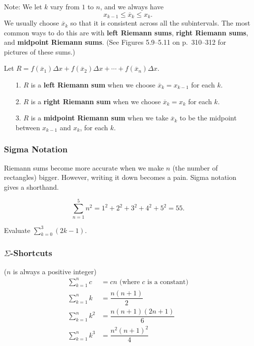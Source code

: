\documentclass[14pt]{beamer}
\newcommand{\dsum}{\displaystyle\sum}
\begin{document}
\begin{frame}
\footnotesize
Note:  We let $k$ vary from $1$ to $n$, and we always have 
\[x_{k-1}\leq \overline x_k\leq x_k.\]  
We usually choose $\overline{x}_k$ so that it is consistent across all the subintervals.  The most common ways to do this are with {\bf left Riemann sums}, {\bf right Riemann sums}, and {\bf midpoint Riemann sums}.  (See Figures 5.9--5.11 on p.\ 310--312 for pictures of these sums.)

\vspace{1pc}
Let $R=f(\overline{x}_1)\Delta x + f(\overline{x}_2)\Delta x + \cdots + f(\overline{x}_n)\Delta x$.
\begin{itemize}
\item[1.] $R$ is a {\bf left Riemann sum} when we choose $\overline x_k=x_{k-1}$ for each $k$.  
\item[2.] $R$ is a {\bf right Riemann sum} when we choose $\overline x_k=x_k$ for each $k$.
\item[3.] $R$ is a {\bf midpoint Riemann sum} when we take $\overline x_k$ to be the midpoint between $x_{k-1}$ and $x_k$, for each $k$.  
\end{itemize}
\end{frame}

\begin{frame}
\frametitle{\small Sigma Notation}
\footnotesize
Riemann sums become more accurate when we make $n$ (the number of rectangles) bigger.  However, writing it down becomes a pain.  Sigma notation gives a shorthand.  

\begin{ex} \[\dsum_{n=1}^5 n^2 = 1^2+2^2+3^2+4^2+5^2=55.\] \end{ex}

\begin{exe} Evaluate $\displaystyle\sum_{k=0}^3 (2k-1)$. \end{exe}
\end{frame}

\begin{frame}
\frametitle{\small $\Sigma$-Shortcuts}
\footnotesize
($n$ is always a positive integer)
\begin{align*}
\dsum_{k=1}^n c & = cn \text{ (where $c$ is a constant)} \\[0.5pc]
\dsum_{k=1}^n k &= \dfrac{n(n+1)}{2} \\[0.5pc]
\dsum_{k=1}^n k^2 &= \dfrac{n(n+1)(2n+1)}{6} \\[0.5pc]
\dsum_{k=1}^n k^3 &= \dfrac{n^2(n+1)^2}{4}
\end{align*}
\end{frame}
\end{document}
